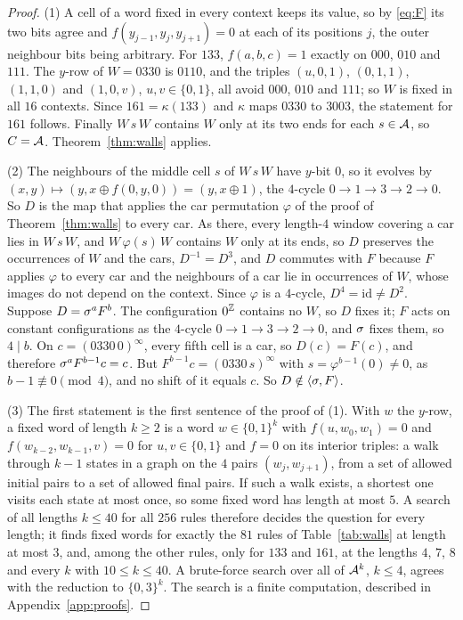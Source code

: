 \begin{proof}
(1) A cell of a word fixed in every context keeps its value, so by \eqref{eq:F} its two bits agree and $f(y_{j-1},y_j,y_{j+1})=0$ at each of its positions $j$, the outer neighbour bits being arbitrary. For $133$, $f(a,b,c)=1$ exactly on $000$, $010$ and $111$. The $y$-row of $W=0330$ is $0110$, and the triples $(u,0,1)$, $(0,1,1)$, $(1,1,0)$ and $(1,0,v)$, $u,v\in\{0,1\}$, all avoid $000$, $010$ and $111$; so $W$ is fixed in all $16$ contexts. Since $161=\kappa(133)$ and $\kappa$ maps $0330$ to $3003$, the statement for $161$ follows. Finally $W\,s\,W$ contains $W$ only at its two ends for each $s\in\mathcal{A}$, so $C=\mathcal{A}$. Theorem~\ref{thm:walls} applies.

(2) The neighbours of the middle cell $s$ of $W\,s\,W$ have $y$-bit $0$, so it evolves by $(x,y)\mapsto(y,x\oplus f(0,y,0))=(y,x\oplus1)$, the $4$-cycle $0\to1\to3\to2\to0$. So $D$ is the map that applies the car permutation $\varphi$ of the proof of Theorem~\ref{thm:walls} to every car. As there, every length-$4$ window covering a car lies in $W\,s\,W$, and $W\,\varphi(s)\,W$ contains $W$ only at its ends, so $D$ preserves the occurrences of $W$ and the cars, $D^{-1}=D^3$, and $D$ commutes with $F$ because $F$ applies $\varphi$ to every car and the neighbours of a car lie in occurrences of $W$, whose images do not depend on the context. Since $\varphi$ is a $4$-cycle, $D^4=\mathrm{id}\ne D^2$. Suppose $D=\sigma^aF^b$. The configuration $0^{\mathbb{Z}}$ contains no $W$, so $D$ fixes it; $F$ acts on constant configurations as the $4$-cycle $0\to1\to3\to2\to0$, and $\sigma$ fixes them, so $4\mid b$. On $c=(0330\,0)^{\infty}$, every fifth cell is a car, so $D(c)=F(c)$, and therefore $\sigma^aF^{b-1}c=c$. But $F^{b-1}c=(0330\,s)^{\infty}$ with $s=\varphi^{b-1}(0)\ne0$, as $b-1\not\equiv0\pmod4$, and no shift of it equals $c$. So $D\notin\langle\sigma,F\rangle$.

(3) The first statement is the first sentence of the proof of (1). With $w$ the $y$-row, a fixed word of length $k\ge2$ is a word $w\in\{0,1\}^k$ with $f(u,w_0,w_1)=0$ and $f(w_{k-2},w_{k-1},v)=0$ for $u,v\in\{0,1\}$ and $f=0$ on its interior triples: a walk through $k-1$ states in a graph on the $4$ pairs $(w_j,w_{j+1})$, from a set of allowed initial pairs to a set of allowed final pairs. If such a walk exists, a shortest one visits each state at most once, so some fixed word has length at most $5$. A search of all lengths $k\le40$ for all $256$ rules therefore decides the question for every length; it finds fixed words for exactly the $81$ rules of Table~\ref{tab:walls} at length at most $3$, and, among the other rules, only for $133$ and $161$, at the lengths $4$, $7$, $8$ and every $k$ with $10\le k\le40$. A brute-force search over all of $\mathcal{A}^k$, $k\le4$, agrees with the reduction to $\{0,3\}^k$. The search is a finite computation, described in Appendix~\ref{app:proofs}.
\end{proof}


